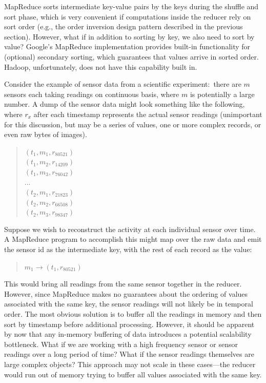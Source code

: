 \documentclass[11pt]{article}
\begin{document}
MapReduce sorts intermediate key-value pairs by the keys during the
shuffle and sort phase, which is very convenient if computations
inside the reducer rely on sort order (e.g., the order inversion
design pattern described in the previous section).  However, what if
in addition to sorting by key, we also need to sort by value?
Google's MapReduce implementation provides built-in functionality for
(optional) secondary sorting, which guarantees that values arrive in
sorted order.  Hadoop, unfortunately, does not have this capability
built in.

Consider the example of sensor data from a scientific
experiment:\ there are $m$ sensors each taking readings on continuous
basis, where $m$ is potentially a large number.  A dump of the sensor
data might look something like the following, where $r_x$ after
each timestamp represents the actual sensor readings (unimportant for
this discussion, but may be a series of values, one or more complex
records, or even raw bytes of images).

\begin{quote}
$(t_1, m_1, r_{80521})$\\
$(t_1, m_2, r_{14209})$\\
$(t_1, m_3, r_{76042})$\\
$...$\\
$(t_2, m_1, r_{21823})$\\
$(t_2, m_2, r_{66508})$\\
$(t_2, m_3, r_{98347})$
\end{quote}

\noindent Suppose we wish to reconstruct the activity at each
individual sensor over time.  A MapReduce program to accomplish this
might map over the raw data and emit the sensor id as the intermediate
key, with the rest of each record as the value:

\begin{quote}
$m_1 \rightarrow (t_1, r_{80521})$
\end{quote}

\noindent This would bring all readings from the same sensor together
in the reducer.  However, since MapReduce makes no guarantees about
the ordering of values associated with the same key, the sensor
readings will not likely be in temporal order.  The most obvious
solution is to buffer all the readings in memory and then sort by
timestamp before additional processing.  However, it should be
apparent by now that any in-memory buffering of data introduces a
potential scalability bottleneck.  What if we are working with a high
frequency sensor or sensor readings over a long period of time?  What
if the sensor readings themselves are large complex objects?  This
approach may not scale in these cases---the reducer would run out of
memory trying to buffer all values associated with the same key.
\end{document}
